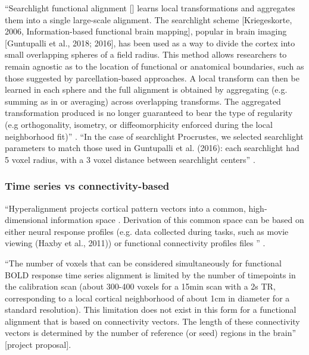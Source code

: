 ``Searchlight functional alignment [\citep{zhang2016searchlight,
guntupalli2016model}] learns local transformations and aggregates them into a
single large-scale alignment.
%
The searchlight scheme [Kriegeskorte, 2006, Information-based functional brain
mapping], popular in brain imaging [Guntupalli et al., 2018; 2016], has been
used as a way to divide the cortex into small overlapping spheres of a field
radius.
%
This method allows researchers to remain agnostic as to the location of
functional or anatomical boundaries, such as those suggested by
parcellation-based approaches.
%
A local transform can then be learned in each sphere and the full alignment is
obtained by aggregating (e.g. summing as in \citep{guntupalli2016model} or
averaging) across overlapping transforms.
%
The aggregated transformation produced is no longer guaranteed to bear the type
of regularity (e.g orthogonality, isometry, or diffeomorphicity enforced during
the local neighborhood fit)'' \citep{bazeille2021empirical}.
%
``In the case of searchlight Procrustes, we selected searchlight parameters to
match those used in Guntupalli et al. (2016):
%
each searchlight had 5 voxel radius, with a 3 voxel distance between searchlight
centers'' \citep{bazeille2021empirical}.


\subsubsection{Time series vs connectivity-based}



``Hyperalignment projects cortical pattern vectors into a common,
high-dimensional information space \citep{haxby2020hyperalignment}.
%
Derivation of this common space can be based on either neural response profiles
(e.g. data collected during tasks, such as movie viewing (Haxby et al., 2011))
or functional connectivity profiles files \citep{guntupalli2018computational}''
\citep{busch2021hybrid}.

``The number of voxels that can be considered simultaneously for functional BOLD
response time series alignment is limited by the number of timepoints in the
calibration scan (about 300-400 voxels for a 15min scan with a 2s TR,
corresponding to a local cortical neighborhood of about 1cm in diameter for a
standard resolution).
%
This limitation does not exist in this form for a functional alignment that is
based on connectivity vectors.
%
The length of these connectivity vectors is determined by the number of
reference (or seed) regions in the brain'' [project proposal].

